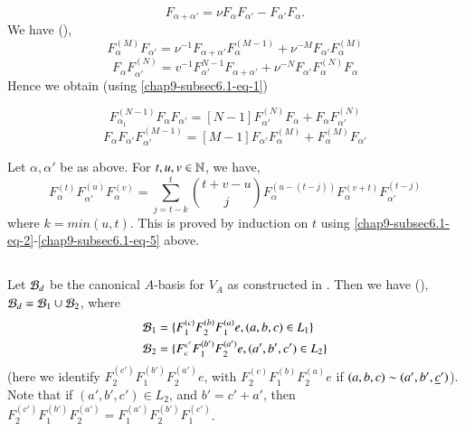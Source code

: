 \setcounter{equation}{0}
\begin{equation*}\label{chap9-subsec6.1-eq-1}
F_{\alpha + \alpha'} = \nu F_{\alpha}F_{\alpha'}-F_{\alpha'}F_{\alpha}.\tag{1}
\end{equation*}
We have (\cite{chap9-keyL1}),
\begin{equation*}\label{chap9-subsec6.1-eq-2}
F_{\alpha}^{(M)}F_{\alpha'} = \nu^{-1}F_{\alpha + \alpha'}F_{\alpha}^{(M-1)}+ \nu^{-M}F_{\alpha'}F_{\alpha}^{(M)}\tag{2}
\end{equation*}
\begin{equation*}\label{chap9-subsec6.1-eq-3}
F_{\alpha}F_{\alpha'}^{(N)} = v^{-1}F_{\alpha'}^{N-1}F_{\alpha+\alpha'}+ \nu^{-N}F_{\alpha'}F_{\alpha}^{(N)}F_{\alpha}\tag{3}
\end{equation*}
Hence we obtain (using \eqref{chap9-subsec6.1-eq-1})

\begin{equation*}\label{chap9-subsec6.1-eq-4}
F_{\alpha_{1}}^{(N-1)}F_{\alpha}F_{\alpha'} = [N-1]F_{\alpha'}^{(N)}F_{\alpha} + F_{\alpha}F_{\alpha'}^{(N)}\tag{4}
\end{equation*}
\begin{equation*}\label{chap9-subsec6.1-eq-5}
F_{\alpha}F_{\alpha'}F_{\alpha'}^{(M-1)} = [M-1]F_{\alpha'}F_{\alpha}^{(M)} + F_{\alpha}^{(M)}F_{\alpha'}\tag{5}
\end{equation*}


\setcounter{definition}{1}
\begin{seclem}\label{chap9-lemma-6.2}
Let $\alpha, \alpha'$ be as above. For $t, u, v \in \mathbb{N}$, we have,
$$
F_{\alpha}^{(t)}F_{\alpha'}^{(u)}F_{\alpha}^{(v)} = \sum\limits_{j=t-k}^{t}\binom{t+v-u}{j} F_{\alpha}^{(u-(t-j))}F_{\alpha}^{(v+t)}F_{\alpha'}^{(t-j)}
$$
where $k =min(u, t)$. This is proved by induction on $t$ using \eqref{chap9-subsec6.1-eq-2}-\eqref{chap9-subsec6.1-eq-5} above.
\end{seclem}

\setcounter{subsection}{2}
\subsection{}\label{chap9-subsec-6.3}
Let $\mathcal{B}_{d}$ be the canonical $A$-basis for $V_{A}$ as constructed in \cite{chap9-keyL2}. Then we have (\cite{chap9-keyL3}),
$\mathcal{B}_{d}= \mathcal{B}_{1} \cup \mathcal{B}_{2}$, where
\begin{align*}
\mathcal{B}_{1} &= \{F_{1}^{(c)} F_{2}^{(b)}F_{1}^{(a)}e,(a,b,c) \in L_{1}\}\\
\mathcal{B}_{2} &= \{F_{c}^{c'}F_{1}^{(b')}F_{2}^{(a')}e, (a',b', c') \in L_{2}\}
\end{align*}
(here we identify $F_{2}^{(c')}F_{1}^{(b')}F_{2}^{(a')}e$, with $F_{2}^{(c)} F_{1}^{(b)}F_{2}^{(a)} e$ if $(a,b,c) \sim (a',b',\break \underline{c}')$). Note that if $(a',b',c')\in L_{2}$, and $b' =c' + a'$, then $F_{2}^{(c')}F_{1}^{(b')}F_{2}^{(a')} = F_{1}^{(a')}F_{2}^{(b')}F_{1}^{(c')}$.

